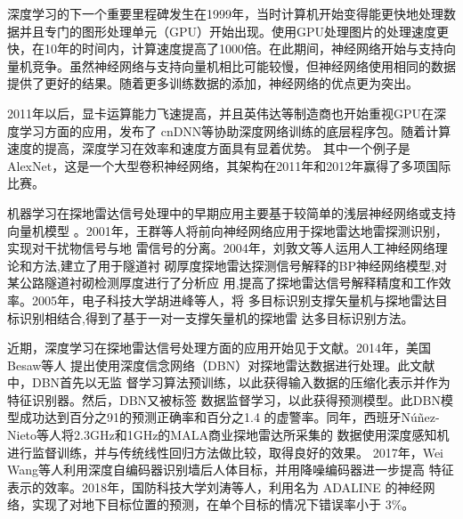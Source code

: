 深度学习的下一个重要里程碑发生在1999年，当时计算机开始变得能更快地处理数据并且专门的图形处理单元（GPU）开始出现。使用GPU处理图片的处理速度更快，在10年的时间内，计算速度提高了1000倍。在此期间，神经网络开始与支持向量机竞争。虽然神经网络与支持向量机相比可能较慢，但神经网络使用相同的数据提供了更好的结果。随着更多训练数据的添加，神经网络的优点更为突出。



2011年以后，显卡运算能力飞速提高，并且英伟达等制造商也开始重视GPU在深度学习方面的应用，发布了
cnDNN等协助深度网络训练的底层程序包。随着计算速度的提高，深度学习在效率和速度方面具有显着优势。
其中一个例子是AlexNet，这是一个大型卷积神经网络，其架构在2011年和2012年赢得了多项国际比赛。

机器学习在探地雷达信号处理中的早期应用主要基于较简单的浅层神经网络或支持向量机模型
。2001年，王群等人将前向神经网络应用于探地雷达地雷探测识别，实现对干扰物信号与地
雷信号的分离。2004年，刘敦文等人运用人工神经网络理论和方法,建立了用于隧道衬
砌厚度探地雷达探测信号解释的BP神经网络模型,对某公路隧道衬砌检测厚度进行了分析应
用,提高了探地雷达信号解释精度和工作效率。2005年，电子科技大学胡进峰等人，将
多目标识别支撑矢量机与探地雷达目标识别相结合,得到了基于一对一支撑矢量机的探地雷
达多目标识别方法。

近期，深度学习在探地雷达信号处理方面的应用开始见于文献。2014年，美国Besaw等人
提出使用深度信念网络（DBN）对探地雷达数据进行处理。此文献中，DBN首先以无监
督学习算法预训练，以此获得输入数据的压缩化表示并作为特征识别器。然后，DBN又被标签
数据监督学习，以此获得预测模型。此DBN模型成功达到百分之91的预测正确率和百分之1.4
的虚警率。同年，西班牙Núñez-Nieto等人将2.3GHz和1GHz的MALA商业探地雷达所采集的
数据使用深度感知机进行监督训练，并与传统线性回归方法做比较，取得良好的效果。
2017年，Wei Wang等人利用深度自编码器识别墙后人体目标，并用降噪编码器进一步提高
特征表示的效率。2018年，国防科技大学刘涛等人，利用名为
ADALINE 的神经网络，实现了对地下目标位置的预测，在单个目标的情况下错误率小于
3\%。

